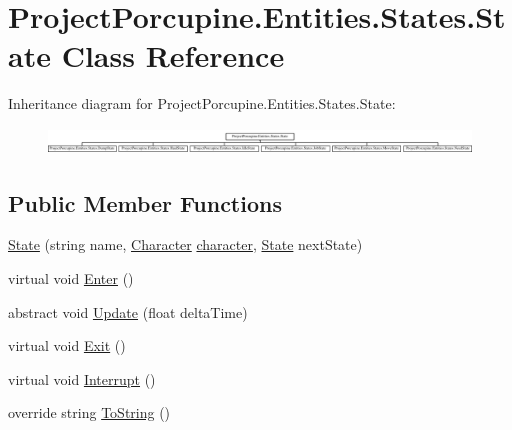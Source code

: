\hypertarget{class_project_porcupine_1_1_entities_1_1_states_1_1_state}{}\section{Project\+Porcupine.\+Entities.\+States.\+State Class Reference}
\label{class_project_porcupine_1_1_entities_1_1_states_1_1_state}
Inheritance diagram for Project\+Porcupine.\+Entities.\+States.\+State\+:\begin{figure}[H]
\begin{center}
\leavevmode
\includegraphics[height=0.707071cm]{class_project_porcupine_1_1_entities_1_1_states_1_1_state}
\end{center}
\end{figure}
\subsection*{Public Member Functions}
\begin{DoxyCompactItemize}
\item 
\hyperlink{class_project_porcupine_1_1_entities_1_1_states_1_1_state_ad7d3195ae32a038f76b90d9b2af8a204}{State} (string name, \hyperlink{class_project_porcupine_1_1_entities_1_1_character}{Character} \hyperlink{class_project_porcupine_1_1_entities_1_1_states_1_1_state_a0647dd5dacc8fba22b1c462c954180c7}{character}, \hyperlink{class_project_porcupine_1_1_entities_1_1_states_1_1_state}{State} next\+State)
\item 
virtual void \hyperlink{class_project_porcupine_1_1_entities_1_1_states_1_1_state_a1e1ee50555cfa4eb75d52876015b54c1}{Enter} ()
\item 
abstract void \hyperlink{class_project_porcupine_1_1_entities_1_1_states_1_1_state_a46337df73c448f5dd84e350e987af8b5}{Update} (float delta\+Time)
\item 
virtual void \hyperlink{class_project_porcupine_1_1_entities_1_1_states_1_1_state_aed1e6db379e98e447596fc72a69eec0c}{Exit} ()
\item 
virtual void \hyperlink{class_project_porcupine_1_1_entities_1_1_states_1_1_state_a82fba061891136da0cc359c54337d0be}{Interrupt} ()
\item 
override string \hyperlink{class_project_porcupine_1_1_entities_1_1_states_1_1_state_adf4aa7bccea2bb293c960a38450664a6}{To\+String} ()
\end{DoxyCompactItemize}
